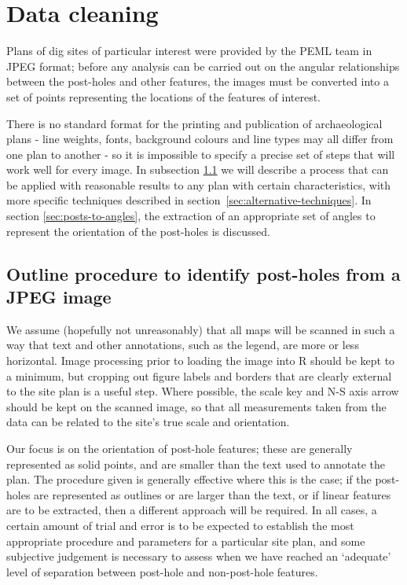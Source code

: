 \documentclass[../../ArchStats.tex]{subfiles}
\begin{document}
 
\section{Data cleaning}
\label{sec:data-cleaning}
Plans of dig sites of particular interest were provided by the PEML team in JPEG format; before any analysis can be carried out on the angular relationships between the post-holes and other features, the images must be converted into a set of points representing the locations of the features of interest.

There is no standard format for the printing and publication of archaeological plans - line weights, fonts, background colours and line types may all differ from one plan to another - so it is impossible to specify a precise set of steps that will work well for every image. In subsection \ref{sec:points-to-JPEG} we will describe a process that can be applied with reasonable results to any plan with certain characteristics, with more specific techniques described in section~\ref{sec:alternative-techniques}. In section \ref{sec:posts-to-angles}, the extraction of an appropriate set of angles to represent the orientation of the post-holes is discussed.



\subsection{Outline procedure to identify post-holes from a JPEG image}
\label{sec:points-to-JPEG}

We assume (hopefully not unreasonably) that all maps will be scanned in such a way that text and other annotations, such as the legend, are more or less horizontal. Image processing prior to loading the image into R should be kept to a minimum, but cropping out figure labels and borders that are clearly external to the site plan is a useful step. Where possible, the scale key and N-S axis arrow should be kept on the scanned image, so that all measurements taken from the data can be related to the site's true scale and orientation.

Our  focus is on the orientation of post-hole features; these are generally represented as solid points, and are smaller than the text used to annotate the plan. The procedure given is generally effective where this is the case; if the post-holes are represented as outlines or are larger than the text, or if linear features are to be extracted, then a different approach will be required. In all cases, a certain amount of trial and error is to be expected to establish the most appropriate procedure and parameters for a particular site plan, and some subjective judgement is necessary to assess when we have reached an `adequate' level of separation between post-hole and non-post-hole features.
\end{document}
